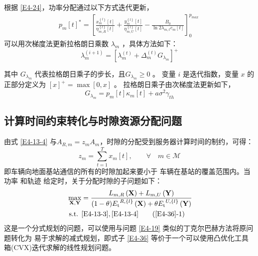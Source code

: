 根据 \eqref{E4-24}，功率分配通过以下方式迭代更新，
\begin{align} \label{E4-26}
{{p}_{m}}{{\left[ t \right]}^{*}}=\left[ \frac{x_{m}^{\left\{ l \right\}}\left[ t \right]}{\eta _{m,R}^{\left\{ l \right\}}\left[ t \right]}+\frac{y_{m}^{\left\{ l \right\}}\left[ t \right]}{\eta _{m,U}^{\left\{ l \right\}}\left[ t \right]}-\frac{{{B}_{0}}}{\ln 2{{\lambda }_{m,t}}{{c}_{m}}\left[ t \right]} \right]_{0}^{{{p}_{max}}\ }
\end{align}
可以用次梯度法更新拉格朗日乘数 $\lambda_m$ ，具体方法如下：
\begin{equation}\label{E4-27}
\lambda _{m}^{\left( i+1 \right)}={{\left[ \lambda _{m}^{\left( t \right)}+\Delta _{m}^{\left( t \right)}{{G}_{{{\lambda}_{m}}}} \right]}^{+}}
\end{equation}

其中 ${{G}_{{{\lambda}_{m}}}}$ 代表拉格朗日乘子的步长，且${{G}_{{{\lambda}_{m}}}}\geq0$ 。
变量 $i$ 是迭代指数，变量 $x$ 的正部分定义为 $\left[x\right]^+=\max{\left[0,x\right]} $ 。
拉格朗日乘子由次梯度法更新如下，
\begin{equation}\label{E4-28}
{{G}_{{{\lambda }_{m}}}}={{p}_{m}}\left[ t \right]{{\kappa }_{m}}\left[ t \right]+a{{\sigma }^{2}}{{\gamma }_{th}}
\end{equation} %
\subsection{计算时间约束转化与时隙资源分配问题}\label{section4-3-3}
由式 \eqref{E4-13-4} 与$A_{R,m}={{z}_{m}}A_m$，时隙的分配受到服务器计算时间的制约，可得：
\begin{equation} \label{E4-35}
{{z}_{m}}=\underset{t=1}{\overset{T}{\mathop{\sum }}}{{x}_{m}}\left[ t \right]   ,\qquad\forall \!\!\!\!\!\! \quad m \in \mathcal{M}
\end{equation}
即车辆向地面基站通信的所有的时隙加起来要小于
车辆在基站的覆盖范围内。当功率 和轨迹 {}给定时，关于分配时隙的子问题如下：
\begin{align} \label{E4-36}
\max _{ \mathbf{X},\mathbf{Y}}  &  ={\frac{{{L}_{m,R}\left( \mathbf{X} \right)+{{L}_{m,U}}\left( \mathbf{Y} \right)}}
{(1-\theta){{E}_{\text{t}}}^{R,\left\{ l \right\}}\left( \mathbf{X} \right)+\theta{{E}_{\text{t}}}^{U,\left\{ l \right\}}\left( \mathbf{Y} \right)}}     \\
\text { s.t. }
& \eqref{E4-13-3},\eqref{E4-13-4}                                                        \tag{\ref{E4-36}{-1}}           \label{E4-36-1}
\end{align}
这是一个分式规划的问题，可以使用与问题 \eqref{E4-19} 类似的丁克尔巴赫方法将原问题转化为
易于求解的减式规划，即式子 \eqref{E4-36} 等价于一个可以使用凸优化工具箱(CVX)迭代求解的线性规划问题。
